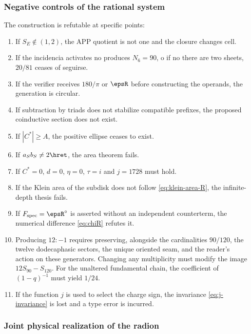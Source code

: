 \subsubsection{Negative controls of the rational system}

The construction is refutable at specific points:
\begin{enumerate}
\item If \(S_E\notin(1,2)\), the APP quotient is not one and the closure changes
cell.
\item If the incidencia activates no produces \(N_6=90\), o if no there are two sheets,
\(20/81\) ceases of seguirse.
\item If the verifier receives \(180/\pi\) or \(\epsR\) before constructing the
operands, the generation is circular.
\item If subtraction by triads does not stabilize compatible prefixes, the
proposed coinductive section does not exist.
\item If \(|C^*|\ge A\), the positive ellipse ceases to exist.
\item If \(a_Sb_S\ne2\hret\), the area theorem fails.
\item If \(C^*=0\), \(d=0\), \(\eta=0\), \(\tau=i\) and
\(j=1728\) must hold.
\item If the Klein area of the subdisk does not follow \eqref{eq:klein-area-R}, the
infinite-depth thesis fails.
\item If \(F_{\mathrm{spec}}=\epsR^\circ\) is asserted without an independent counterterm, the
numerical difference \eqref{eq:chiR} refutes it.
\item Producing \(12:-1\) requires preserving, alongside the cardinalities
\(90/120\), the twelve dodecaphasic sectors, the unique oriented seam, and
the reader's action on these generators. Changing any multiplicity
must modify the image \(12S_{90}-S_{120}\). For the unaltered fundamental
chain, the coefficient of \((1-q)^{-1}\) must yield \(1/24\).
\item If the function \(j\) is used to select the charge sign, the
invariance \eqref{eq:j-invariance} is lost and a type error is incurred.
\end{enumerate}

\subsubsection{Joint physical realization of the radion}

